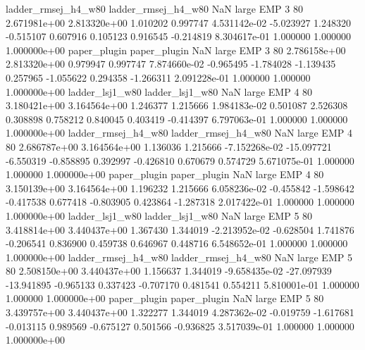 ladder_rmsej_h4_w80 ladder_rmsej_h4_w80                   NaN      large      EMP                 3 80 2.671981e+00   2.813320e+00      1.010202       0.997747  4.531142e-02     -5.023927      1.248320    -0.515107       0.607916  0.105123   0.916545    -0.214819   8.304617e-01            1.000000        1.000000        1.000000e+00
       paper_plugin        paper_plugin                   NaN      large      EMP                 3 80 2.786158e+00   2.813320e+00      0.979947       0.997747  7.874660e-02     -0.965495     -1.784028    -1.139435       0.257965 -1.055622   0.294358    -1.266311   2.091228e-01            1.000000        1.000000        1.000000e+00
    ladder_lsj1_w80     ladder_lsj1_w80                   NaN      large      EMP                 4 80 3.180421e+00   3.164564e+00      1.246377       1.215666  1.984183e-02      0.501087      2.526308     0.308898       0.758212  0.840045   0.403419    -0.414397   6.797063e-01            1.000000        1.000000        1.000000e+00
ladder_rmsej_h4_w80 ladder_rmsej_h4_w80                   NaN      large      EMP                 4 80 2.686787e+00   3.164564e+00      1.136036       1.215666 -7.152268e-02    -15.097721     -6.550319    -0.858895       0.392997 -0.426810   0.670679     0.574729   5.671075e-01            1.000000        1.000000        1.000000e+00
       paper_plugin        paper_plugin                   NaN      large      EMP                 4 80 3.150139e+00   3.164564e+00      1.196232       1.215666  6.058236e-02     -0.455842     -1.598642    -0.417538       0.677418 -0.803905   0.423864    -1.287318   2.017422e-01            1.000000        1.000000        1.000000e+00
    ladder_lsj1_w80     ladder_lsj1_w80                   NaN      large      EMP                 5 80 3.418814e+00   3.440437e+00      1.367430       1.344019 -2.213952e-02     -0.628504      1.741876    -0.206541       0.836900  0.459738   0.646967     0.448716   6.548652e-01            1.000000        1.000000        1.000000e+00
ladder_rmsej_h4_w80 ladder_rmsej_h4_w80                   NaN      large      EMP                 5 80 2.508150e+00   3.440437e+00      1.156637       1.344019 -9.658435e-02    -27.097939    -13.941895    -0.965133       0.337423 -0.707170   0.481541     0.554211   5.810001e-01            1.000000        1.000000        1.000000e+00
       paper_plugin        paper_plugin                   NaN      large      EMP                 5 80 3.439757e+00   3.440437e+00      1.322277       1.344019  4.287362e-02     -0.019759     -1.617681    -0.013115       0.989569 -0.675127   0.501566    -0.936825   3.517039e-01            1.000000        1.000000        1.000000e+00
